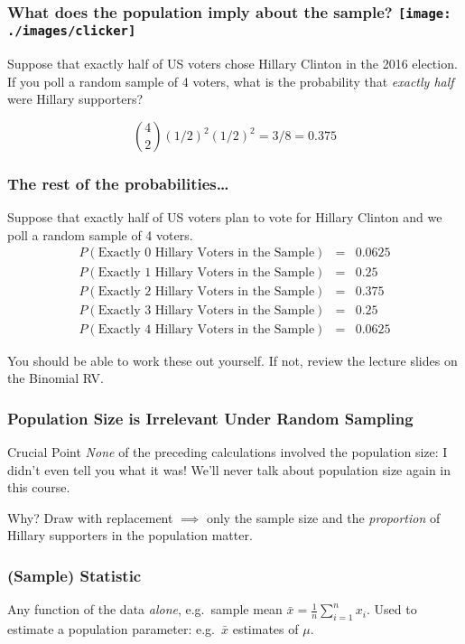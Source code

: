 \begin{frame}
  \frametitle{What does the population imply about the sample? \hfill\texttt{[image: ./images/clicker]}}
Suppose that exactly half of US voters chose Hillary Clinton in the 2016 election.
If you poll a random sample of 4 voters, what is the probability that \emph{exactly half} were Hillary supporters? 

\pause

\alert{$${4 \choose 2} \left( 1/2 \right)^2 \left( 1/2 \right)^2 = 3/8 = 0.375$$}
\end{frame}
\begin{frame}
  \frametitle{The rest of the probabilities\dots}
  Suppose that exactly half of US voters plan to vote for Hillary Clinton and we poll a random sample of 4 voters.
  \begin{eqnarray*}
    P\left( \mbox{Exactly 0 Hillary Voters in the Sample} \right) &=& 0.0625\\
    P\left( \mbox{Exactly 1 Hillary Voters in the Sample} \right) &=& 0.25\\
    P\left( \mbox{Exactly 2 Hillary Voters in the Sample} \right) &=& 0.375\\
    P\left( \mbox{Exactly 3 Hillary Voters in the Sample} \right) &=& 0.25\\
    P\left( \mbox{Exactly 4 Hillary Voters in the Sample} \right) &=& 0.0625 
  \end{eqnarray*}

  \vspace{1em}
  \alert{You should be able to work these out yourself. If not, review the lecture slides on the Binomial RV.}
\end{frame}
\begin{frame}
  \frametitle{Population Size is Irrelevant Under Random Sampling}

  \begin{block}{Crucial Point}
    \emph{None} of the preceding calculations involved the population size: I didn't even tell you what it was!
    We'll never talk about population size again in this course.
  \end{block}

  \begin{block}{Why?}
    Draw with replacement $\implies$ only the sample size and the \emph{proportion} of Hillary supporters in the population matter.
  \end{block}

\end{frame}
\begin{frame}
  \frametitle{(Sample) Statistic}

  Any function of the data \emph{alone}, e.g.\ sample mean $\bar{x} = \frac{1}{n}\sum_{i=1}^n x_i$. 
  Used to estimate a population parameter: e.g.\ $\bar{x}$ estimates of
  $\mu$.

\end{frame}

